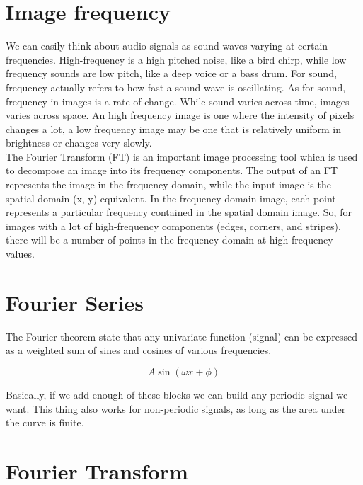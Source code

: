\documentclass{article}
\begin{document}
\newpage

\section*{Image frequency}

We can easily think about audio signals as sound waves varying at certain frequencies. High-frequency is a high pitched noise, like a bird chirp, while low frequency sounds are low pitch, like a deep voice or a bass drum. For sound, frequency actually refers to how fast a sound wave is oscillating. As for sound, frequency in images is a rate of change. While sound varies across time, images varies across space. An high frequency image is one where the intensity of pixels changes a lot, a low frequency image may be one that is relatively uniform in brightness or changes very slowly. \\

The Fourier Transform (FT) is an important image processing tool which is used to decompose an image into its frequency components. The output of an FT represents the image in the frequency domain, while the input image is the spatial domain (x, y) equivalent. In the frequency domain image, each point represents a particular frequency contained in the spatial domain image. So, for images with a lot of high-frequency components (edges, corners, and stripes), there will be a number of points in the frequency domain at high frequency values.

\section*{Fourier Series}

The Fourier theorem state that any univariate function (signal) can be expressed as a weighted sum of sines and cosines of various frequencies. 

\begin{equation*}
    A \sin(\omega x + \phi) 
\end{equation*}

Basically, if we add enough of these blocks we can build any periodic signal we want. This thing also works for non-periodic signals, as long as the area under the curve is finite.

\section*{Fourier Transform}
\end{document}
